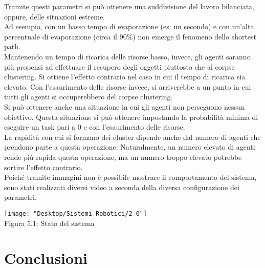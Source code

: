 \documentclass[12pt,a4paper,openright,twoside]{report}
\begin{document}
Tramite questi parametri si può ottenere una suddivisione del lavoro bilanciata, oppure, delle situazioni estreme.\\
Ad esempio, con un basso tempo di evaporazione (es: un secondo) e con un'alta percentuale di evaporazione (circa il 90\%) non emerge il fenomeno dello shortest path.\\
Mantenendo un tempo di ricarica delle risorse basso, invece, gli agenti saranno più propensi ad effettuare il recupero degli oggetti piuttosto che al corpse clustering. Si ottiene l'effetto contrario nel caso in cui il tempo di ricarica sia elevato. Con l'esaurimento delle risorse invece, si arriverebbe a un punto in cui tutti gli agenti si occuperebbero del corpse clustering.\\
Si può ottenere anche una situazione in cui gli agenti non perseguono nessun obiettivo. Questa situazione si può ottenere impostando la probabilità minima di eseguire un task pari a 0 e con l'esaurimento delle risorse.\\
La rapidità con cui si formano dei cluster dipende anche dal numero di agenti che prendono parte a questa operazione. Naturalmente, un numero elevato di agenti rende più rapida questa operazione, ma un numero troppo elevato potrebbe sortire l'effetto contrario.\\
Poiché tramite immagini non è possibile mostrare il comportamento del sistema, sono stati realizzati diversi video a seconda della diversa configurazione dei parametri.

\begin{center}  
	\texttt{[image: "Desktop/Sistemi Robotici/2\_0"]}
	\\Figura 5.1: Stato del sistema
\end{center}


\clearpage{\pagestyle{empty}\cleardoublepage}
\chapter{Conclusioni}                %
\lhead[\fancyplain{}{\bfseries\thepage}]{\fancyplain{}{\bfseries\rightmark}}
\end{document}
